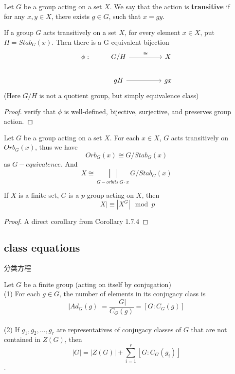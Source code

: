 \documentclass[11pt,fleqn]{book} %
\begin{document}
\begin{CJK}{UTF8}{gkai}
\begin{definition}
	[transitive] Let $G$ be a group acting on a set $X$. We say that the action is {\bf transitive} if \\
	for any $x,y \in X$, there exists $g \in G$, such that $x = gy$.
\end{definition}

\begin{proposition}
	If a group $G$ acts transitively on a set $X$, for every element $x \in X$, put $H = Stab_G(x)$. Then there is a G-equivalent bijection
	\[\begin{tikzcd}
		{\phi:} & {G/H} && X \\
		& gH && gx
		\arrow["\cong", from=1-2, to=1-4]
		\arrow[from=2-2, to=2-4]
	\end{tikzcd}\]
	(Here $G/H$ is not a quotient group, but simply equivalence class)
\end{proposition}
\begin{proof}
	verify that $\phi$ is well-defined, bijective, surjective, and preserves group action.
\end{proof}

\begin{corollary}
	Let $G$ be a group acting on a set $X$. For each $x \in X$, $G$ acts transitively on $Orb_G(x)$, thus we have
	\[Orb_G(x) \cong G/Stab_G(x)\] as $G-equivalence$.
	And 
	\[X\cong \bigsqcup_{G-orbits \ G\cdot x} G/Stab_G(x)\] 
\end{corollary}

\begin{corollary}
	If $X$ is a finite set, $G$ is a $p$-group acting on $X$, then
	\[|X| \equiv |X^G| \mod p\]
\end{corollary}
\begin{proof}
	A direct corollary from Corollary 1.7.4
\end{proof}

\subsection{class equations}
分类方程
\begin{theorem}
	 Let $G$ be a finite group (acting on itself by conjugation) \\
	(1) For each $g \in G$, the number of elements in its conjugacy class is \[|Ad_G(g)| = \frac {|G|} {C_G(g)} = [G:C_G(g)]\] \\
	(2) If $g_1, g_2,...,g_r$ are representatives of conjugacy classes of $G$ that are not contained in $Z(G)$, then 
	\[|G| = |Z(G)| + \sum_{i=1}^r [G : C_G(g_i)]\].
\end{theorem}


\end{CJK}
\end{document}
